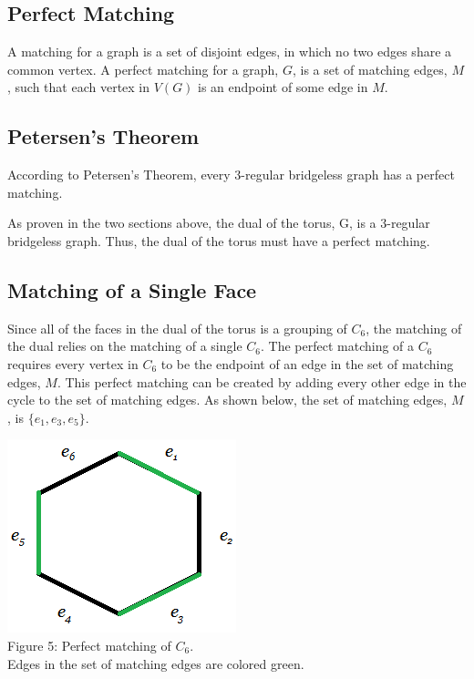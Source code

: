 \documentclass[12pt]{article}
\begin{document}
\begin{flushleft}
\section*{Perfect Matching}
A matching for a graph is a set of disjoint edges, in which no two edges share a common vertex. A perfect matching for a graph, $G$, is a set of matching edges, $M$, such that each vertex in $V(G)$ is an endpoint of some edge in $M$.

\subsection*{Petersen's Theorem}
\medskip
According to Petersen's Theorem, every 3-regular bridgeless graph has a perfect matching.

\medskip
As proven in the two sections above, the dual of the torus, G, is a 3-regular bridgeless graph. Thus, the dual of the torus must have a perfect matching.

\subsection*{Matching of a Single Face}
\medskip
Since all of the faces in the dual of the torus is a grouping of $C_6$, the matching of the dual relies on the matching of a single $C_6$. The perfect matching of a $C_6$ requires every vertex in $C_6$ to be the endpoint of an edge in the set of matching edges, $M$. This perfect matching can be created by adding every other edge in the cycle to the set of matching edges. As shown below, the set of matching edges, $M$, is $\{e_1, e_3, e_5\}$.

\begin{center}
\includegraphics[scale=1]{images/c6matching.png}\\
Figure 5: Perfect matching of $C_6$.\\
Edges in the set of matching edges are colored green.
\end{center}


\end{flushleft}
\end{document}
